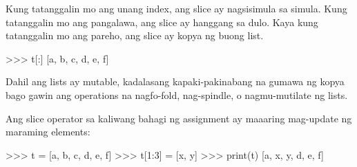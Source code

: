 \documentclass[10pt,]{book}
\newenvironment{Shaded}{}{}
\newcommand{\BuiltInTok}[1]{\textcolor[rgb]{0.00,0.50,0.00}{#1}}
\newcommand{\DecValTok}[1]{\textcolor[rgb]{0.25,0.63,0.44}{#1}}
\newcommand{\NormalTok}[1]{#1}
\newcommand{\OperatorTok}[1]{\textcolor[rgb]{0.40,0.40,0.40}{#1}}
\newcommand{\StringTok}[1]{\textcolor[rgb]{0.25,0.44,0.63}{#1}}
\begin{document}
Kung tatanggalin mo ang unang index, ang slice ay nagsisimula sa simula.
Kung tatanggalin mo ang pangalawa, ang slice ay hanggang sa dulo. Kaya
kung tatanggalin mo ang pareho, ang slice ay kopya ng buong list.

  

\begin{Shaded}
\begin{Highlighting}[]
\OperatorTok{\textgreater{}\textgreater{}\textgreater{}}\NormalTok{ t[:]}
\NormalTok{[}\StringTok{\textquotesingle{}a\textquotesingle{}}\NormalTok{, }\StringTok{\textquotesingle{}b\textquotesingle{}}\NormalTok{, }\StringTok{\textquotesingle{}c\textquotesingle{}}\NormalTok{, }\StringTok{\textquotesingle{}d\textquotesingle{}}\NormalTok{, }\StringTok{\textquotesingle{}e\textquotesingle{}}\NormalTok{, }\StringTok{\textquotesingle{}f\textquotesingle{}}\NormalTok{]}
\end{Highlighting}
\end{Shaded}

Dahil ang lists ay mutable, kadalasang kapaki-pakinabang na gumawa ng
kopya bago gawin ang operations na nagfo-fold, nag-spindle, o
nagmu-mutilate ng lists.


Ang slice operator sa kaliwang bahagi ng assignment ay maaaring
mag-update ng maraming elements:

 

\begin{Shaded}
\begin{Highlighting}[]
\OperatorTok{\textgreater{}\textgreater{}\textgreater{}}\NormalTok{ t }\OperatorTok{=}\NormalTok{ [}\StringTok{\textquotesingle{}a\textquotesingle{}}\NormalTok{, }\StringTok{\textquotesingle{}b\textquotesingle{}}\NormalTok{, }\StringTok{\textquotesingle{}c\textquotesingle{}}\NormalTok{, }\StringTok{\textquotesingle{}d\textquotesingle{}}\NormalTok{, }\StringTok{\textquotesingle{}e\textquotesingle{}}\NormalTok{, }\StringTok{\textquotesingle{}f\textquotesingle{}}\NormalTok{]}
\OperatorTok{\textgreater{}\textgreater{}\textgreater{}}\NormalTok{ t[}\DecValTok{1}\NormalTok{:}\DecValTok{3}\NormalTok{] }\OperatorTok{=}\NormalTok{ [}\StringTok{\textquotesingle{}x\textquotesingle{}}\NormalTok{, }\StringTok{\textquotesingle{}y\textquotesingle{}}\NormalTok{]}
\OperatorTok{\textgreater{}\textgreater{}\textgreater{}} \BuiltInTok{print}\NormalTok{(t)}
\NormalTok{[}\StringTok{\textquotesingle{}a\textquotesingle{}}\NormalTok{, }\StringTok{\textquotesingle{}x\textquotesingle{}}\NormalTok{, }\StringTok{\textquotesingle{}y\textquotesingle{}}\NormalTok{, }\StringTok{\textquotesingle{}d\textquotesingle{}}\NormalTok{, }\StringTok{\textquotesingle{}e\textquotesingle{}}\NormalTok{, }\StringTok{\textquotesingle{}f\textquotesingle{}}\NormalTok{]}
\end{Highlighting}
\end{Shaded}
\end{document}
